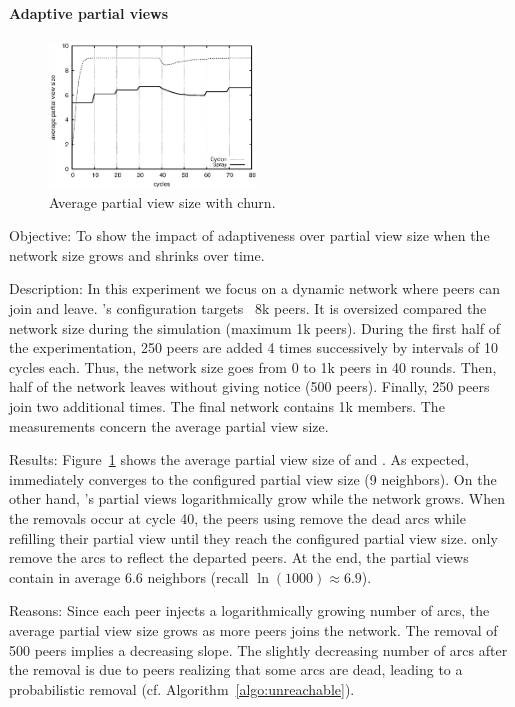 \paragraph{Adaptive partial views}

\begin{figure}
  \centering
  \includegraphics[width=0.49\textwidth]{img/avgpv.eps}
  \caption{\label{fig:churn}Average partial view size with churn.}
\end{figure}

\begin{asparadesc}
\item[Objective:] To show the impact of adaptiveness over partial view size when
  the network size grows and shrinks over time.
\item[Description:] In this experiment we focus on a dynamic network where peers
  can join and leave.  \CYCLON's configuration targets ~8k peers. It is
  oversized compared the network size during the simulation (maximum 1k
  peers). During the first half of the experimentation, 250 peers are added 4
  times successively by intervals of 10 cycles each. Thus, the network size goes
  from 0 to 1k peers in 40 rounds. Then, half of the network leaves without
  giving notice (500 peers). Finally, 250 peers join two additional times. The
  final network contains 1k members. The measurements concern the average
  partial view size.
\item[Results:] Figure~\ref{fig:churn} shows the average partial view size of
  \SPRAY and \CYCLON. As expected, \CYCLON immediately converges to the
  configured partial view size (9 neighbors). On the other hand, \SPRAY's
  partial views logarithmically grow while the network grows. When the removals
  occur at cycle 40, the peers using \CYCLON remove the dead arcs while
  refilling their partial view until they reach the configured partial view
  size. \SPRAY only remove the arcs to reflect the departed peers. At the end,
  the \SPRAY partial views contain in average 6.6 neighbors (recall
  $\ln(1000)\approx 6.9$).
\item[Reasons:] Since each peer injects a logarithmically growing number of
  arcs, the average partial view size grows as more peers joins the network.
  The removal of 500 peers implies a decreasing slope. The slightly decreasing
  number of arcs after the removal is due to peers realizing that some arcs are
  dead, leading to a probabilistic removal (cf. Algorithm~\ref{algo:unreachable}).
\end{asparadesc}

